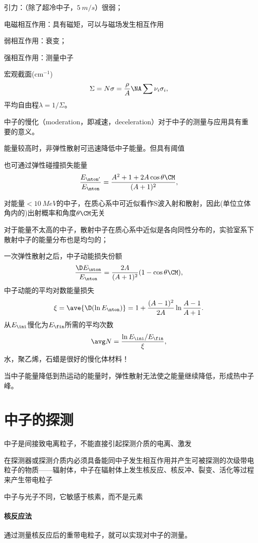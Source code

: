 \begin{compactitem}
	\item 引力：（除了超冷中子，$\SI{5}{m/s}$）很弱；
	\item 电磁相互作用：具有磁矩，可以与磁场发生相互作用
	\item 弱相互作用：衰变；
	\item 强相互作用：测量中子
\end{compactitem}
宏观截面(cm$^{-1}$)
\[
	\Sigma=N\sigma=\frac\rho{A}\NA\sum\nu_i\sigma_i,
\]
平均自由程$\lambda=1/\Sigma$。

中子的慢化（moderation，即减速，deceleration）对于中子的测量与应用具有重要的意义。
\begin{compactitem}
	\item 能量较高时，非弹性散射可迅速降低中子能量。但具有阈值
	\item 也可通过弹性碰撞损失能量
	\[
		\frac{E_{\nton'}}{E_\nton}=\frac{A^2+1+2A\cos\theta\CM}{(A+1)^2},
	\]
\end{compactitem}
对能量$<\SI{10}{MeV}$的中子，在质心系中可近似看作S波入射和散射，因此(单位立体角内的)出射概率和角度$\theta\CM$无关

对于能量不太高的中子，散射中子在质心系中近似是各向同性分布的，实验室系下散射中子的能量分布也是均匀的；

一次弹性散射之后，中子动能损失份额
\[
	\frac{\D E_\nton}{E_\nton}=\frac{2A}{(A+1)^2}(1-\cos\theta\CM),
\]
中子动能的平均对数能量损失
\[
	\xi=\ave{\D(\ln E_\nton)}=1+\frac{(A-1)^2}{2A}\ln\frac{A-1}{A+1}.
\]
从$E_\ini$慢化为$E_\fin$所需的平均次数
\[
	\avg N=\frac{\ln E_\ini/E_\fin}{\xi},
\]
水，聚乙烯，石蜡是很好的慢化体材料！

当中子能量降低到热运动的能量时，弹性散射无法使之能量继续降低，形成热中子峰。

\section{中子的探测}

中子是间接致电离粒子，不能直接引起探测介质的电离、激发

在探测器或探测介质内必须具备能同中子发生相互作用并产生可被探测的次级带电粒子的物质——辐射体，中子在辐射体上发生核反应、核反冲、裂变、活化等过程来产生带电粒子

中子与光子不同，它敏感于核素，而不是元素
\paragraph{核反应法}通过测量核反应后的重带电粒子，就可以实现对中子的测量。

